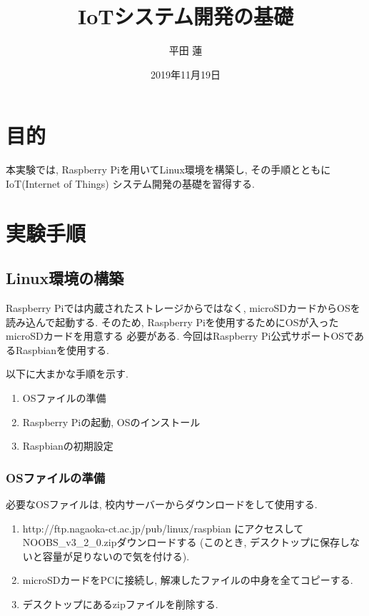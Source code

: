 \documentclass[titlepage]{jsarticle}
\title{IoTシステム開発の基礎}
\author{平田 蓮}
\date{2019年11月19日}
\begin{document}
\maketitle
\section{目的}
    本実験では, Raspberry Piを用いてLinux環境を構築し, その手順とともにIoT(Internet of Things)
    システム開発の基礎を習得する.

\section{実験手順}
    \subsection{Linux環境の構築}
        Raspberry Piでは内蔵されたストレージからではなく,
        microSDカードからOSを読み込んで起動する.
        そのため, Raspberry Piを使用するためにOSが入ったmicroSDカードを用意する
        必要がある. 今回はRaspberry Pi公式サポートOSであるRaspbianを使用する.

        以下に大まかな手順を示す.

        \begin{enumerate}
            \item OSファイルの準備
            \item Raspberry Piの起動, OSのインストール
            \item Raspbianの初期設定
        \end{enumerate}

        \subsubsection{OSファイルの準備}
            必要なOSファイルは, 校内サーバーからダウンロードをして使用する.

            \begin{enumerate}
                \item http://ftp.nagaoka-ct.ac.jp/pub/linux/raspbian
                    にアクセスしてNOOBS\_v3\_2\_0.zipダウンロードする
                    (このとき, デスクトップに保存しないと容量が足りないので気を付ける).
                \item microSDカードをPCに接続し, 解凍したファイルの中身を全てコピーする.
                \item デスクトップにあるzipファイルを削除する.
            \end{enumerate}
\end{document}
